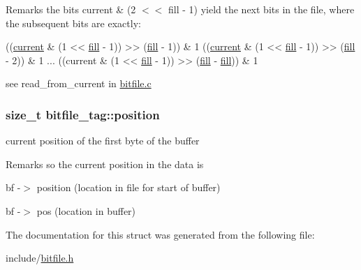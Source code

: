\begin{DoxyRemark}{Remarks}
the bits current \& (2 $<$$<$ fill -\/ 1) yield the next bits in the file, where the subsequent bits are exactly\+: 
\begin{DoxyCode}
((\hyperlink{structbitfile__tag_a97ba7a275396a5960058f45eac93f04f}{current} & (1 << \hyperlink{structbitfile__tag_a7c0f772984d9115919e4db0241c2e4b1}{fill} - 1)) >> (\hyperlink{structbitfile__tag_a7c0f772984d9115919e4db0241c2e4b1}{fill} - 1)) & 1
((\hyperlink{structbitfile__tag_a97ba7a275396a5960058f45eac93f04f}{current} & (1 << \hyperlink{structbitfile__tag_a7c0f772984d9115919e4db0241c2e4b1}{fill} - 1)) >> (\hyperlink{structbitfile__tag_a7c0f772984d9115919e4db0241c2e4b1}{fill} - 2)) & 1
...
((current & (1 << \hyperlink{structbitfile__tag_a7c0f772984d9115919e4db0241c2e4b1}{fill} - 1)) >> (\hyperlink{structbitfile__tag_a7c0f772984d9115919e4db0241c2e4b1}{fill} - \hyperlink{structbitfile__tag_a7c0f772984d9115919e4db0241c2e4b1}{fill})) & 1
\end{DoxyCode}
 see read\+\_\+from\+\_\+current in \hyperlink{bitfile_8c}{bitfile.\+c} 
\end{DoxyRemark}
\hypertarget{structbitfile__tag_a8c2eb7c5b5312471f74c68ba93231f7c}{
\subsubsection[{position}]{\setlength{\rightskip}{0pt plus 5cm}size\+\_\+t bitfile\+\_\+tag\+::position}}\label{structbitfile__tag_a8c2eb7c5b5312471f74c68ba93231f7c}


current position of the first byte of the buffer 

\begin{DoxyRemark}{Remarks}
so the current position in the data is
\begin{DoxyItemize}
\item bf -\/$>$ position (location in file for start of buffer)
\item bf -\/$>$ pos (location in buffer) 
\end{DoxyItemize}
\end{DoxyRemark}


The documentation for this struct was generated from the following file\+:\begin{DoxyCompactItemize}
\item 
include/\hyperlink{bitfile_8h}{bitfile.\+h}\end{DoxyCompactItemize}
